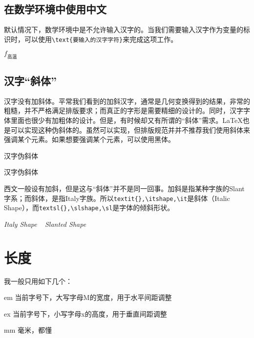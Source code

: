\subsection{在数学环境中使用中文}
默认情况下，数学环境中是不允许输入汉字的。当我们需要输入汉字作为变量的标识时，可以使用\verb|\text{要输入的汉字字符}|来完成这项工作。

\begin{codeshow}
$f_{\text{高温}}$
\end{codeshow}

\subsection{汉字“斜体”}
汉字没有加斜体。平常我们看到的加斜汉字，通常是几何变换得到的结果，非常的粗糙，并不严格满足排版要求；而真正的字形是需要精细的设计的。同时，汉字字体里面也很少有加粗体的设计。但是，有时候却又有所谓的“斜体”需求。\LaTeX 也是可以实现这种伪斜体的。虽然可以实现，但排版规范并并不推荐我们使用斜体来强调某个元素。如果想要强调某个元素，可以使用{\heiti 黑体}。

\begin{center}
	{汉字伪斜体}
\end{center}

\begin{latex}{}
{汉字伪斜体}
\end{latex}

西文一般设有加斜，但是这与“斜体”并不是同一回事。加斜是指某种字族的Slant字系；而斜体，是指Italy字族。所以\verb|textit{},\itshape,\it|是斜体（Italic Shape），而\verb|textsl{},\slshape,\sl|是字体的倾斜形状。

\begin{center}
	{ \textit{Italy Shape} ~ \textsl{Slanted Shape}}
\end{center}

\section{长度}

我一般只用如下几个：

\begin{asparadesc}
	\item[em] 当前字号下，大写字母M的宽度，用于水平间距调整
	\item[ex] 当前字号下，小写字母x的高度，用于垂直间距调整
	\item[mm] 毫米，都懂
\end{asparadesc}



